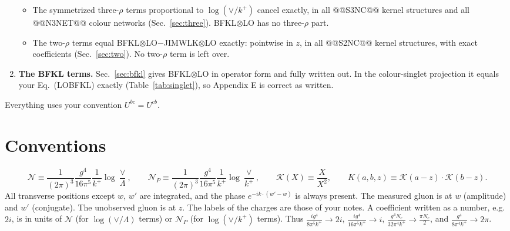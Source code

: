 \documentclass[10pt]{article}
\numberwithin{equation}{section}
\newcommand{\KK}{\mathcal K}
\newcommand{\NN}{\mathcal N}
\newcommand{\NP}{\mathcal N_{P}}
\begin{document}
\begin{enumerate}
\begin{itemize}
\item The symmetrized three-$\rho$ terms proportional to $\log(\vee/k^+)$ cancel exactly, in all @@S3NC@@ kernel structures and all @@N3NET@@ colour networks (Sec.~\ref{sec:three}). BFKL$\otimes$LO has no three-$\rho$ part.
\item The two-$\rho$ terms equal BFKL$\otimes$LO$-$JIMWLK$\otimes$LO exactly: pointwise in $z$, in all @@S2NC@@ kernel structures, with exact coefficients (Sec.~\ref{sec:two}). No two-$\rho$ term is left over.
\end{itemize}
\item \textbf{The BFKL terms.} Sec.~\ref{sec:bfkl} gives BFKL$\otimes$LO in operator form and fully written out. In the colour-singlet projection it equals your Eq.~(LOBFKL) exactly (Table~\ref{tab:singlet}), so Appendix E is correct as written.
\end{enumerate}
Everything uses your convention $U^{bc}=U^{cb}$.

\section{Conventions}\label{sec:conv}
\begin{equation}
\NN\equiv\frac{1}{(2\pi)^3}\frac{g^4}{16\pi^5}\frac{1}{k^+}\log\frac{\vee}{\Lambda},\qquad
\NP\equiv\frac{1}{(2\pi)^3}\frac{g^4}{16\pi^5}\frac{1}{k^+}\log\frac{\vee}{k^+},\qquad
\KK(X)\equiv\frac{X}{X^2},\qquad K(a,b,z)\equiv\KK(a-z)\cdot\KK(b-z).
\end{equation}
All transverse positions except $w$, $w'$ are integrated, and the phase $e^{-ik\cdot(w'-w)}$ is always present. The measured gluon is at $w$ (amplitude) and $w'$ (conjugate). The unobserved gluon is at $z$. The labels of the charges are those of your notes. A coefficient written as a number, e.g.\ $2i$, is in units of $\NN$ (for $\log(\vee/\Lambda)$ terms) or $\NP$ (for $\log(\vee/k^+)$ terms). Thus $\frac{ig^4}{8\pi^5k^+}\to 2i$, $\frac{ig^4}{16\pi^5k^+}\to i$, $\frac{g^4N_c}{32\pi^4k^+}\to\frac{\pi N_c}{2}$, and $\frac{g^4}{8\pi^4k^+}\to 2\pi$.
\end{document}
